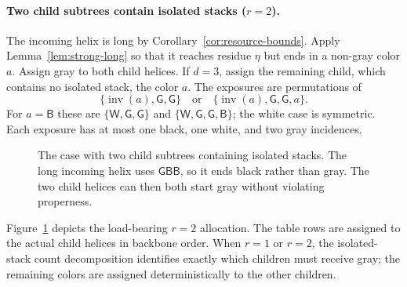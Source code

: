 \documentclass[11pt]{article}
\newcommand{\Bcol}{\mathsf{B}}
\newcommand{\Wcol}{\mathsf{W}}
\newcommand{\Gray}{\mathsf{G}}
\newcommand{\inv}{\operatorname{inv}}
\begin{document}
\paragraph{Two child subtrees contain isolated stacks ($r=2$).}
The incoming helix is long by Corollary~\ref{cor:resource-bounds}.  Apply Lemma~\ref{lem:strong-long} so that it reaches residue $\eta$ but ends in a non-gray color $a$.  Assign gray to both child helices.  If $d=3$, assign the remaining child, which contains no isolated stack, the color $a$.  The exposures are permutations of
\[
\{\inv(a),\Gray,\Gray\}
\quad\text{or}\quad
\{\inv(a),\Gray,\Gray,a\}.
\]
For $a=\Bcol$ these are $\{\Wcol,\Gray,\Gray\}$ and $\{\Wcol,\Gray,\Gray,\Bcol\}$; the white case is symmetric.  Each exposure has at most one black, one white, and two gray incidences.

\begin{figure}[t]
\centering
{}
\caption{The case with two child subtrees containing isolated stacks.  The long incoming helix uses $\Gray\Bcol\Bcol$, so it ends black rather than gray.  The two child helices can then both start gray without violating properness.}
\label{fig:two-child}
\end{figure}

Figure~\ref{fig:two-child} depicts the load-bearing $r=2$ allocation.  The table rows are assigned to the actual child helices in backbone order.  When $r=1$ or $r=2$, the isolated-stack count decomposition identifies exactly which children must receive gray; the remaining colors are assigned deterministically to the other children.
\end{document}
